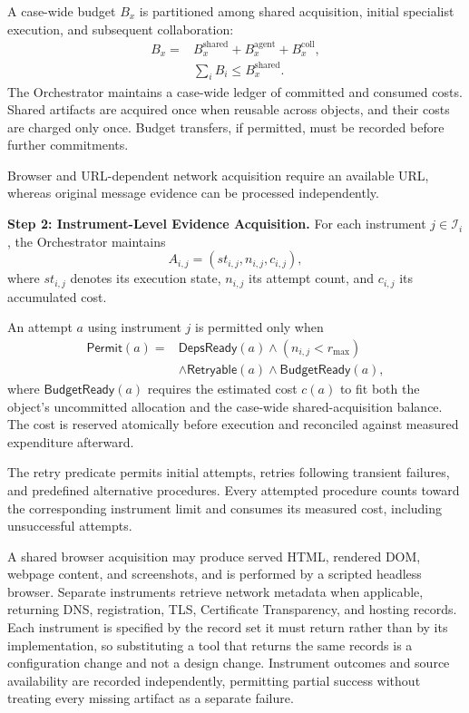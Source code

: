 A case-wide budget $B_x$ is partitioned
among shared acquisition, initial specialist
execution, and subsequent collaboration:
\begin{equation}
\begin{aligned}
B_x={}&B_x^{\mathrm{shared}}
+B_x^{\mathrm{agent}}
+B_x^{\mathrm{coll}},\\
&\sum_i B_i\leq B_x^{\mathrm{shared}}.
\end{aligned}
\label{eq:case-budget}
\end{equation}
The Orchestrator maintains a case-wide ledger
of committed and consumed costs. Shared
artifacts are acquired once when reusable
across objects, and their costs are charged
only once. Budget transfers, if permitted,
must be recorded before further commitments.

Browser and URL-dependent network acquisition
require an available URL, whereas original
message evidence can be processed independently.

\medskip
\noindent\textbf{Step 2: Instrument-Level
Evidence Acquisition.}
For each instrument $j\in\mathcal I_i$,
the Orchestrator maintains
\begin{equation}
A_{i,j}=
(st_{i,j},n_{i,j},c_{i,j}),
\label{eq:acquisition-state}
\end{equation}
where $st_{i,j}$ denotes its execution state,
$n_{i,j}$ its attempt count, and $c_{i,j}$
its accumulated cost.

An attempt $a$ using instrument $j$ is
permitted only when
\begin{equation}
\begin{aligned}
\mathsf{Permit}(a)={}&
\mathsf{DepsReady}(a)
\land(n_{i,j}<r_{\max})\\
&\land\mathsf{Retryable}(a)
\land\mathsf{BudgetReady}(a),
\end{aligned}
\label{eq:acquisition-permit}
\end{equation}
where $\mathsf{BudgetReady}(a)$ requires
the estimated cost $c(a)$ to fit both
the object's uncommitted allocation and
the case-wide shared-acquisition balance.
The cost is reserved atomically before
execution and reconciled against measured
expenditure afterward.

The retry predicate permits initial
attempts, retries following transient
failures, and predefined alternative
procedures. Every attempted procedure
counts toward the corresponding instrument
limit and consumes its measured cost,
including unsuccessful attempts.

A shared browser acquisition may produce
served HTML, rendered DOM, webpage content,
and screenshots, and is performed by a
scripted headless browser. Separate
instruments retrieve network metadata when
applicable, returning DNS, registration,
TLS, Certificate Transparency, and hosting
records. Each instrument is specified by
the record set it must return rather than
by its implementation, so substituting a
tool that returns the same records is a
configuration change and not a design
change.
Instrument outcomes and source availability
are recorded independently, permitting
partial success without treating every
missing artifact as a separate failure.


